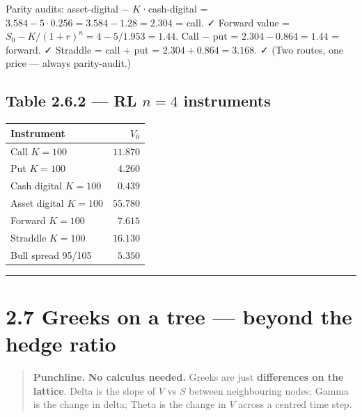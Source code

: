 \documentclass[
  10pt,
  twoside]{book}
\newcounter{none} %
\begin{document}
Parity audits: asset-digital − \(K\)·cash-digital =
\(3.584-5\cdot 0.256=3.584-1.28=2.304\) = call. ✓ Forward value =
\(S_0 - K/(1+r)^n = 4 - 5/1.953 = 1.44\). Call − put =
\(2.304 - 0.864 = 1.44\) = forward. ✓ Straddle = call + put =
\(2.304 + 0.864 = 3.168\). ✓ (Two routes, one price --- always
parity-audit.)

\subsection{\texorpdfstring{Table 2.6.2 --- RL \(n=4\)
instruments}{Table 2.6.2 --- RL n=4 instruments}}\label{table-2.6.2-rl-n4-instruments}

{\def\LTcaptype{none} %
\begin{table}[H]
\centering
\begin{tabular}{|l|r|}
\toprule
Instrument & \(V_0\) \\
\midrule



Call \(K=100\) & \(11.870\) \\
Put \(K=100\) & \(\phantom{0}4.260\) \\
Cash digital \(K=100\) & \(\phantom{0}0.439\) \\
Asset digital \(K=100\) & \(55.780\) \\
Forward \(K=100\) & \(\phantom{0}7.615\) \\
Straddle \(K=100\) & \(16.130\) \\
Bull spread 95/105 & \(\phantom{0}5.350\) \\
\bottomrule
\end{tabular}
\end{table}
}

\begin{center}\rule{0.5\linewidth}{0.5pt}\end{center}

\section{2.7 Greeks on a tree --- beyond the hedge
ratio}\label{greeks-on-a-tree-beyond-the-hedge-ratio}

\begin{quote}
\textbf{Punchline.} \textbf{No calculus needed.} Greeks are just
\textbf{differences on the lattice}. Delta is the slope of \(V\) vs
\(S\) between neighbouring nodes; Gamma is the change in delta; Theta is
the change in \(V\) across a centred time step.
\end{quote}
\end{document}
